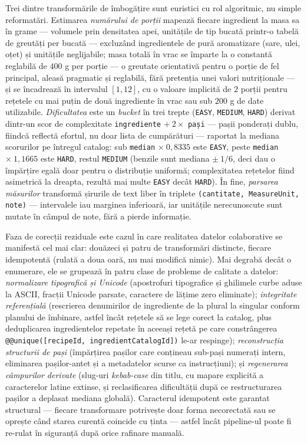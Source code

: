 Trei dintre transformările de îmbogățire sunt euristici cu rol algoritmic, nu simple reformatări. Estimarea \textit{numărului de porții} mapează fiecare ingredient la masa sa în grame --- volumele prin densitatea apei, unitățile de tip bucată printr-o tabelă de greutăți per bucată --- excluzând ingredientele de pură aromatizare (sare, ulei, oțet) și unitățile neglijabile; masa totală în vrac se împarte la o constantă reglabilă de \(400\) g per porție --- o greutate orientativă pentru o porție de fel principal, aleasă pragmatic și reglabilă, fără pretenția unei valori nutriționale --- și se încadrează în intervalul \([1, 12]\), cu o valoare implicită de \(2\) porții pentru rețetele cu mai puțin de două ingrediente în vrac sau sub \(200\) g de date utilizabile. \textit{Dificultatea} este un \textit{bucket} în trei trepte (\texttt{EASY}, \texttt{MEDIUM}, \texttt{HARD}) derivat dintr-un scor de complexitate \texttt{ingrediente} \(+\ 2 \times\) \texttt{pași} --- pașii ponderați dublu, fiindcă reflectă efortul, nu doar lista de cumpărături --- raportat la mediana scorurilor pe întregul catalog: sub \texttt{median} \(\times\ 0{,}8335\) este \texttt{EASY}, peste \texttt{median} \(\times\ 1{,}1665\) este \texttt{HARD}, restul \texttt{MEDIUM} (benzile sunt mediana \(\pm\ 1/6\), deci dau o împărțire egală doar pentru o distribuție uniformă; complexitatea rețetelor fiind asimetrică la dreapta, rezultă mai multe \texttt{EASY} decât \texttt{HARD}). În fine, \textit{parsarea măsurilor} transformă șirurile de text liber în triplete \texttt{(cantitate, \texttt{MeasureUnit}, note)} --- intervalele iau marginea inferioară, iar unitățile nerecunoscute sunt mutate în câmpul de note, fără a pierde informație.

Faza de corecții reziduale este cazul în care realitatea datelor colaborative se manifestă cel mai clar: douăzeci și patru de transformări distincte, fiecare idempotentă (rulată a doua oară, nu mai modifică nimic). Mai degrabă decât o enumerare, ele se grupează în patru clase de probleme de calitate a datelor: \textit{normalizare tipografică și Unicode} (apostrofuri tipografice și ghilimele curbe aduse la ASCII, fracții Unicode parsate, caractere de lățime zero eliminate); \textit{integritate referențială} (rescrierea denumirilor de ingrediente de la plural la singular conform planului de îmbinare, astfel încât rețetele să se lege corect la catalog, plus deduplicarea ingredientelor repetate în aceeași rețetă pe care constrângerea \texttt{@@unique([recipeId, ingredientCatalogId])} le-ar respinge); \textit{reconstrucția structurii de pași} (împărțirea pașilor care conțineau sub-pași numerați intern, eliminarea pașilor-antet și a metadatelor scurse ca instrucțiuni); și \textit{regenerarea câmpurilor derivate} (slug-uri \textit{kebab-case} din titlu, cu mapare explicită a caracterelor latine extinse, și reclasificarea dificultății după ce restructurarea pașilor a deplasat mediana globală). Caracterul idempotent este garantat structural --- fiecare transformare potrivește doar forma necorectată sau se oprește când starea curentă coincide cu ținta --- astfel încât pipeline-ul poate fi re-rulat în siguranță după orice rafinare manuală.

